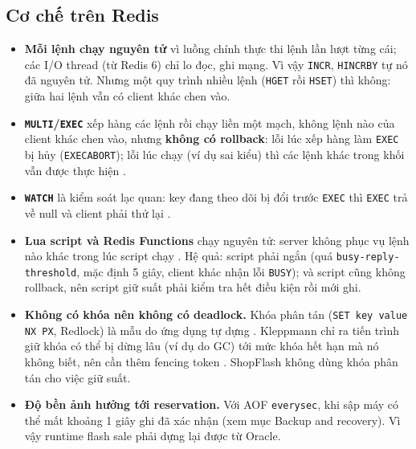 \subsection{Cơ chế trên Redis}\label{sec:cc-redis}

\begin{itemize}
  \item \textbf{Mỗi lệnh chạy nguyên tử} vì luồng chính thực thi lệnh lần lượt từng cái; các I/O thread (từ Redis 6) chỉ lo đọc, ghi mạng. Vì vậy \texttt{INCR}, \texttt{HINCRBY} tự nó đã nguyên tử. Nhưng một quy trình nhiều lệnh (\texttt{HGET} rồi \texttt{HSET}) thì không: giữa hai lệnh vẫn có client khác chen vào.
  \item \textbf{\texttt{MULTI}/\texttt{EXEC}} xếp hàng các lệnh rồi chạy liền một mạch, không lệnh nào của client khác chen vào, nhưng \textbf{không có rollback}: lỗi lúc xếp hàng làm \texttt{EXEC} bị hủy (\texttt{EXECABORT}); lỗi lúc chạy (ví dụ sai kiểu) thì các lệnh khác trong khối vẫn được thực hiện \cite{cc-redis-transactions}.
  \item \textbf{\texttt{WATCH}} là kiểm soát lạc quan: key đang theo dõi bị đổi trước \texttt{EXEC} thì \texttt{EXEC} trả về null và client phải thử lại \cite{cc-redis-transactions}.
  \item \textbf{Lua script và Redis Functions} chạy nguyên tử: server không phục vụ lệnh nào khác trong lúc script chạy \cite{cc-redis-eval, cc-redis-functions}. Hệ quả: script phải ngắn (quá \texttt{busy-reply-threshold}, mặc định 5 giây, client khác nhận lỗi \texttt{BUSY}); và script cũng không rollback, nên script giữ suất phải kiểm tra hết điều kiện rồi mới ghi.
  \item \textbf{Không có khóa nên không có deadlock.} Khóa phân tán (\texttt{SET key value NX PX}, Redlock) là mẫu do ứng dụng tự dựng \cite{cc-redis-distlock}. Kleppmann chỉ ra tiến trình giữ khóa có thể bị dừng lâu (ví dụ do GC) tới mức khóa hết hạn mà nó không biết, nên cần thêm fencing token \cite{cc-kleppmann2016, cc-kleppmann2017}. ShopFlash không dùng khóa phân tán cho việc giữ suất.
  \item \textbf{Độ bền ảnh hưởng tới reservation.} Với AOF \texttt{everysec}, khi sập máy có thể mất khoảng 1 giây ghi đã xác nhận (xem mục Backup and recovery). Vì vậy runtime flash sale phải dựng lại được từ Oracle.
\end{itemize}

